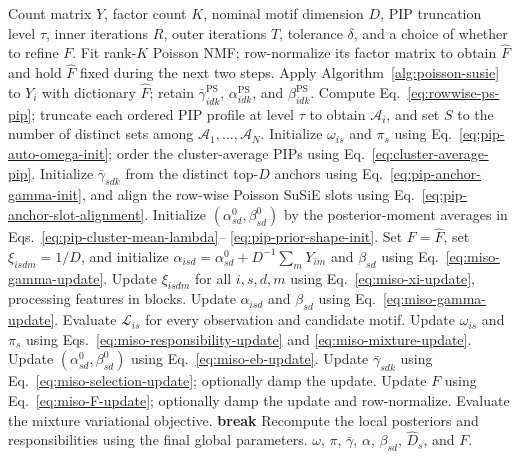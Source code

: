 \documentclass[11pt]{article}
\theoremstyle{plain}
\theoremstyle{definition}
\begin{document}
\begin{algorithm}[t]
\caption{MiSo variational empirical-Bayes fitting}
\label{alg:miso}
\small
\begin{algorithmic}[1]
\Require Count matrix $Y$, factor count $K$, nominal motif dimension $D$,
PIP truncation level $\tau$, inner iterations $R$, outer iterations $T$,
tolerance $\delta$, and a choice of whether to refine $F$.
\State Fit rank-$K$ Poisson NMF; row-normalize its factor matrix to obtain
$\widehat F$ and hold $\widehat F$ fixed during the next two steps.
  \State Apply Algorithm~\ref{alg:poisson-susie} to $Y_i$ with dictionary
  $\widehat F$; retain $\bar\gamma^{\mathrm{PS}}_{idk}$,
  $\alpha^{\mathrm{PS}}_{idk}$, and $\beta^{\mathrm{PS}}_{idk}$.
\EndFor
\State Compute Eq.~\eqref{eq:rowwise-ps-pip}; truncate each ordered PIP
profile at level $\tau$ to obtain $\mathcal A_i$, and set $S$ to the number
of distinct sets among $\mathcal A_1,\ldots,\mathcal A_N$.
\State Initialize $\omega_{is}$ and $\pi_s$ using
Eq.~\eqref{eq:pip-auto-omega-init}; order the cluster-average PIPs using
Eq.~\eqref{eq:cluster-average-pip}.
\State Initialize $\bar\gamma_{sdk}$ from the distinct top-$D$ anchors using
Eq.~\eqref{eq:pip-anchor-gamma-init}, and align the row-wise Poisson SuSiE
slots using Eq.~\eqref{eq:pip-anchor-slot-alignment}.
\State Initialize $(\alpha_{sd}^0,\beta_{sd}^0)$ by the posterior-moment
averages in Eqs.~\eqref{eq:pip-cluster-mean-lambda}--
\eqref{eq:pip-prior-shape-init}.
\State Set $F=\widehat F$, set $\xi_{isdm}=1/D$, and initialize
$\alpha_{isd}=\alpha_{sd}^0+D^{-1}\sum_mY_{im}$ and $\beta_{sd}$ using
Eq.~\eqref{eq:miso-gamma-update}.
    \State Update $\xi_{isdm}$ for all $i,s,d,m$ using
    Eq.~\eqref{eq:miso-xi-update}, processing features in blocks.
    \State Update $\alpha_{isd}$ and $\beta_{sd}$ using
    Eq.~\eqref{eq:miso-gamma-update}.
  \EndFor
  \State Evaluate $\mathcal L_{is}$ for every observation and candidate motif.
  \State Update $\omega_{is}$ and $\pi_s$ using
  Eqs.~\eqref{eq:miso-responsibility-update} and
  \eqref{eq:miso-mixture-update}.
    \State Update $(\alpha_{sd}^0,\beta_{sd}^0)$ using
    Eq.~\eqref{eq:miso-eb-update}.
  \EndIf
  \State Update $\bar\gamma_{sdk}$ using
  Eq.~\eqref{eq:miso-selection-update}; optionally damp the update.
    \State Update $F$ using Eq.~\eqref{eq:miso-F-update}; optionally damp the
    update and row-normalize.
  \EndIf
  \State Evaluate the mixture variational objective.
    \State \textbf{break}
  \EndIf
\EndFor
\State Recompute the local posteriors and responsibilities using the final
global parameters.
\State \Return $\omega$, $\pi$, $\bar\gamma$, $\alpha$, $\beta_{sd}$,
$\widehat D_s$, and $F$.
\end{algorithmic}
\end{algorithm}
\end{document}
